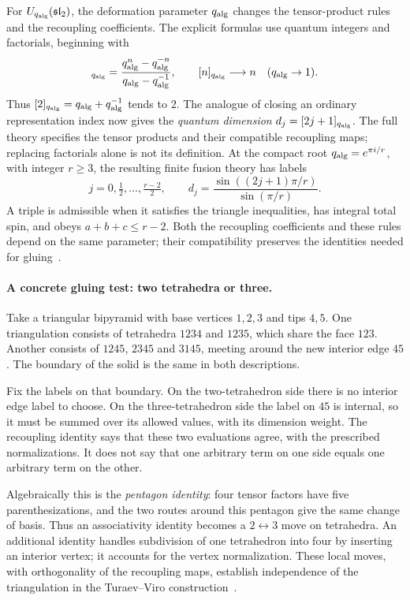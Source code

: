 For $U_{q_{\rm alg}}(\mathfrak{sl}_2)$, the deformation parameter
$q_{\rm alg}$ changes the tensor-product rules and the recoupling
coefficients. The explicit formulas use quantum integers and
factorials, beginning with
\begin{equation}
 [n]_{q_{\rm alg}}
 =\frac{q_{\rm alg}^{n}-q_{\rm alg}^{-n}}
        {q_{\rm alg}-q_{\rm alg}^{-1}},\qquad
 [n]_{q_{\rm alg}}\longrightarrow n\quad(q_{\rm alg}\to1).
 \label{eq:introqinteger}
\end{equation}
Thus $[2]_{q_{\rm alg}}=q_{\rm alg}+q_{\rm alg}^{-1}$ tends to $2$.
The analogue of closing an ordinary representation index now gives
the \emph{quantum dimension} $d_j=[2j+1]_{q_{\rm alg}}$.
The full theory specifies the tensor products and their compatible
recoupling maps; replacing factorials alone is not its definition.
At the compact root $q_{\rm alg}=e^{\pi i/r}$, with integer $r\ge3$,
the resulting finite fusion theory has labels
\[
 j=0,\tfrac12,\ldots,\tfrac{r-2}{2},\qquad
 d_j=\frac{\sin((2j+1)\pi/r)}{\sin(\pi/r)}.
\]
A triple is admissible when it satisfies the triangle inequalities,
has integral total spin, and obeys $a+b+c\le r-2$.
Both the recoupling coefficients and these rules depend on the
same parameter; their compatibility preserves the identities
needed for gluing~\cite{TaylorWoodward}.

\paragraph{A concrete gluing test: two tetrahedra or three.}
Take a triangular bipyramid with base vertices $1,2,3$ and tips
$4,5$. One triangulation consists of tetrahedra $1234$ and $1235$,
which share the face $123$. Another consists of $1245$, $2345$
and $3145$, meeting around the new interior edge $45$.
The boundary of the solid is the same in both descriptions.

Fix the labels on that boundary. On the two-tetrahedron side
there is no interior edge label to choose. On the three-tetrahedron
side the label on $45$ is internal, so it must be summed over its
allowed values, with its dimension weight. The recoupling identity
says that these two evaluations agree, with the prescribed
normalizations. It does not say that one arbitrary term on one
side equals one arbitrary term on the other.

Algebraically this is the \emph{pentagon identity}: four tensor
factors have five parenthesizations, and the two routes around
this pentagon give the same change of basis. Thus an associativity
identity becomes a $2\leftrightarrow3$ move on tetrahedra.
An additional identity handles subdivision of one tetrahedron into
four by inserting an interior vertex; it accounts for the vertex
normalization. These local moves, with orthogonality of the
recoupling maps, establish independence of the triangulation in the
Turaev--Viro construction~\cite{TuraevViro1992}.

